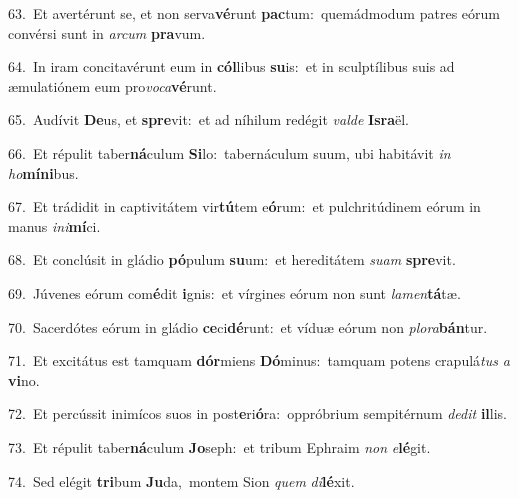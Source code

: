 {\numbfont\textcolor{\numbcolor}{63.}}~Et avertérunt se, et non serva\-\textbf{vé}\-runt \textbf{pac}\-tum:~\star quemádmodum patres eórum convérsi sunt in \textit{ar}\-\textit{cum} \textbf{pra}\-vum.\par
{\numbfont\textcolor{\numbcolor}{64.}}~In iram concitavérunt eum in \textbf{cól}\-libus \textbf{su}\-is:~\star et in sculptílibus suis ad æmulatiónem eum pro\-\textit{vo}\-\textit{ca}\textbf{vé}runt.\par
{\numbfont\textcolor{\numbcolor}{65.}}~Audívit \textbf{De}\-us, et \textbf{spre}\-vit:~\star et ad níhilum redégit \textit{val}\-\textit{de} \textbf{Is}\-\textbf{ra}ël.\par
{\numbfont\textcolor{\numbcolor}{66.}}~Et répulit taber\-\textbf{ná}\-culum \textbf{Si}\-lo:~\star tabernáculum suum, ubi habitávit \textit{in} \textit{ho}\-\textbf{mí}\textbf{ni}bus.\par
{\numbfont\textcolor{\numbcolor}{67.}}~Et trádidit in captivitátem vir\-\textbf{tú}\-tem e\-\textbf{ó}\-rum:~\star et pulchritúdinem eórum in manus \textit{in}\-\textit{i}\textbf{mí}ci.\par
{\numbfont\textcolor{\numbcolor}{68.}}~Et conclúsit in gládio \textbf{pó}\-pulum \textbf{su}\-um:~\star et hereditátem \textit{su}\-\textit{am} \textbf{spre}\-vit.\par
{\numbfont\textcolor{\numbcolor}{69.}}~Júvenes eórum com\-\textbf{é}\-dit \textbf{i}\-gnis:~\star et vírgines eórum non sunt \textit{la}\-\textit{men}\textbf{tá}tæ.\par
{\numbfont\textcolor{\numbcolor}{70.}}~Sacerdótes eórum in gládio \textbf{ce}\-ci\-\textbf{dé}\-runt:~\star et víduæ eórum non \textit{plo}\-\textit{ra}\textbf{bán}tur.\par
{\numbfont\textcolor{\numbcolor}{71.}}~Et excitátus est tamquam \textbf{dór}\-miens \textbf{Dó}\-minus:~\star tamquam potens crapulá\textit{tus} \textit{a} \textbf{vi}\-no.\par
{\numbfont\textcolor{\numbcolor}{72.}}~Et percússit inimícos suos in post\-\textbf{e}\-ri\-\textbf{ó}\-ra:~\star oppróbrium sempitérnum \textit{de}\-\textit{dit} \textbf{il}\-lis.\par
{\numbfont\textcolor{\numbcolor}{73.}}~Et répulit taber\-\textbf{ná}\-culum \textbf{Jo}\-seph:~\star et tribum Ephraim \textit{non} \textit{e}\-\textbf{lé}git.\par
{\numbfont\textcolor{\numbcolor}{74.}}~Sed elégit \textbf{tri}\-bum \textbf{Ju}\-da,~\star montem Sion \textit{quem} \textit{di}\-\textbf{lé}xit.\par
